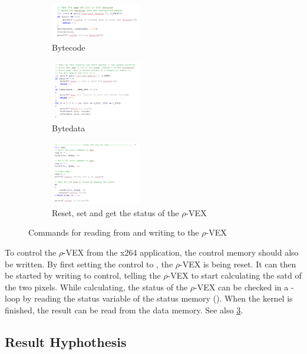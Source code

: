 \begin{figure}
	\centering
	\begin{subfigure} [h] {0.3\textwidth}
		\centering
		\includegraphics[width=150px]{Pictures/imem}
		\caption{Bytecode}
		\label{fig:imem}
	\end{subfigure}
	\quad
	\begin{subfigure} [h] {0.3\textwidth}
		\centering
		\includegraphics[width=150px]{Pictures/dmem}
		\caption{Bytedata}
		\label{fig:dmem}
	\end{subfigure}
	\quad
	\begin{subfigure} [h] {0.3\textwidth}
		\centering
		\includegraphics[width=150px]{Pictures/smem}
		\caption{Reset, set and get the status of the $\rho$-VEX}
		\label{fig:smem}
	\end{subfigure}
	\quad
\caption{Commands for reading from and writing to the $\rho$-VEX}%
\label{}%
\end{figure}

To control the $\rho$-VEX from the x264 application, the control memory should also be written. By first setting the control to , the $\rho$-VEX is being reset. It can then be started by writing  to control, telling the $\rho$-VEX to start calculating the satd of the two pixels. While calculating, the status of the $\rho$-VEX can be checked in a -loop by reading the status variable of the status memory (). When the  kernel is finished, the result can be read from the data memory. See also \ref{fig:smem}.

\subsection{Result Hyphothesis}


